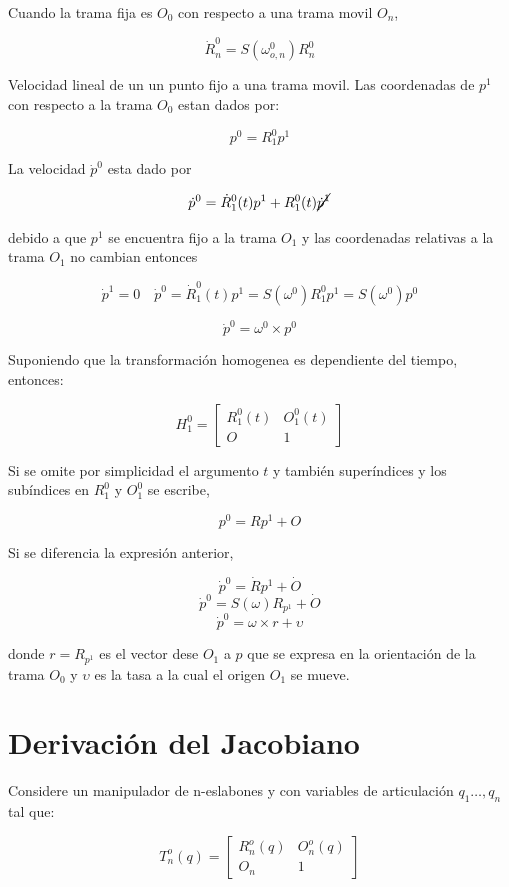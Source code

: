 \documentclass[10pt,a4paper]{article}
\begin{document}
 Cuando la trama fija es $O_0$ con respecto a una trama movil $O_n$,

 $$ \dot{R}_{n}^{0} = S(\omega_{o,n}^0)R_n^0 $$

 Velocidad lineal de un un punto fijo a una trama movil. Las coordenadas de $p^1$ con respecto a la trama $O_0$ estan dados por:

 $$ p^0 = R_1^0 p^1$$

 La velocidad $\dot{p}^0$ esta dado por

 $$ \dot{p}^0 = \dot{R}_1^0(t) p^1 + R_1^0(t) \cancel{\dot{p}^1} $$

 debido a que $p^1$ se encuentra fijo a la trama $O_1$ y las coordenadas relativas a la trama $O_1$ no cambian entonces

 $$ \dot{p}^1 = 0 \quad \dot{p}^0 = \dot{R}_1^0(t) p^1 = S(\omega^0)R_1^0 p^1 = S(\omega^0) p^0 $$

 $$ \dot{p}^0 = \omega^0 \times p^0 $$

 Suponiendo que la transformación homogenea es dependiente del tiempo, entonces:

 $$
	H_1^0 =
	\begin{bmatrix}
		R_1^0(t) & O_1^0(t) \\
		O & 1
	\end{bmatrix}
 $$

 Si se omite por simplicidad el argumento $t$ y también superíndices y los subíndices en $R_1^0$ y $O_1^0$ se escribe,

 $$ p^0 = R p^1 + O $$

 Si se diferencia la expresión anterior,

 $$ \dot{p}^0 = \dot{R} p^1 + \dot{O}$$
 $$ \dot{p}^0 = S(\omega) R_{p^1} + \dot{O}$$
 $$ \dot{p}^0 = \omega \times r + \upsilon$$

 donde $r=R_{p^1}$ es el vector dese $O_1$ a $p$ que se expresa en la orientación de la trama $O_0$ y $\upsilon$ es la tasa a la cual el origen $O_1$ se mueve.

\section{Derivación del Jacobiano}
Considere un manipulador de n-eslabones y con variables de articulación $q_1 \dots, q_n$ tal que:

$$
	T_n^o(q) =
	\begin{bmatrix}
		R_n^o(q) & O_n^o(q) \\
		O_n & 1
	\end{bmatrix}
$$
\end{document}
